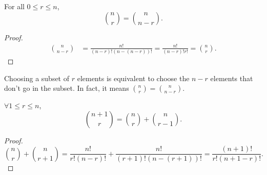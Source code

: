 \begin{observation}
    For all \(0 \le r \le n\), 
    \[
        \binom{n}{r} = \binom{n}{n - r}.
    \] 
\end{observation}
\begin{proof}
    \begin{align*}
        \binom{n}{n-r} &= \frac{n!}{(n-r)!(n-(n-r))!} = \frac{n!}{(n-r)!r!} = \binom{n}{r}.
    \end{align*}
\end{proof}

\begin{observation}
    Choosing a subset of \(r\) elements is equivalent to choose the \(n - r\) elements that don't go in the subset. In fact, it means \(\binom{n}{r} = \binom{n}{n-r}\).  
\end{observation}

\begin{proposition}
    \(\forall 1 \le r \le n\),
    \[
        \binom{n + 1}{r} = \binom{n}{r} + \binom{n}{r - 1}.
    \] 
\end{proposition}
\begin{proof}
    \[
        \binom{n}{r} + \binom{n}{r+1} = \frac{n!}{r!(n-r)!} + \frac{n!}{(r+1)!(n-(r+1))!} = \frac{(n+1)!}{r!(n+1-r)!}.
    \]
\end{proof}